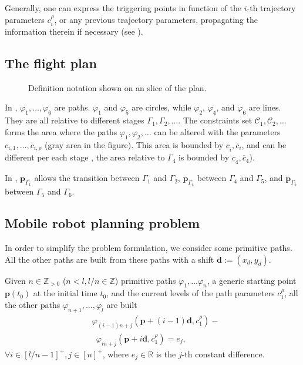 Generally, one can express the triggering points in function of the $i$-th trajectory parameters $c_{i}^{\rho}$, or any previous trajectory parameters, propagating the information therein if necessary (see ).

\subsection{\color{cyan}The flight plan}

\begin{figure}[h]
  \centering
  
  \caption[Definition notation on a slice of the plan]{Definition notation shown on an slice of the plan.}
  \label{fig:traj1}
\end{figure}

In , $\varphi_1,\dots,\varphi_6$ are paths. $\varphi_1$ and $\varphi_5$ are circles, while $\varphi_2$, $\varphi_4$, and $\varphi_6$ are lines. They are all relative to different stages $\Gamma_1,\Gamma_2,\dots$. The constraints set $\mathcal{C}_1,\mathcal{C}_2,\dots$ forms the area where the paths $\varphi_1,\varphi_2,\dots$ can be altered with the parameters $c_{i,1},\dots,c_{i,\rho}$ (gray area in the figure). This area is bounded by $\underline{c}_i,\overline{c}_i$, and can be different per each stage , the area relative to $\Gamma_4$ is bounded by $\underline{c}_4,\overline{c}_4$).

In , $\mathbf{p}_{\Gamma_1}$ allows the transition between $\Gamma_1$ and $\Gamma_2$, $\mathbf{p}_{\Gamma_4}$ between $\Gamma_4$ and $\Gamma_5$, and $\mathbf{p}_{\Gamma_5}$ between $\Gamma_5$ and $\Gamma_6$.

\subsection{Mobile robot planning problem}
\label{sec:plan-pb}

In order to simplify the problem formulation, we consider some primitive paths. All the other paths are built from these paths with a shift $\mathbf{d}:=(x_d,y_d)$.

Given $n\in\mathbb{Z}_{>0}$ ($n<l,l/n\in\mathbb{Z}$) primitive paths $\varphi_1,\dots\varphi_n$, a generic starting point $\mathbf{p}(t_0)$ at the initial time $t_0$, and the current levels of the path parameters $c_1^\rho$, all the other paths $\varphi_{n+1},\dots,\varphi_l$ are built
\begin{equation}\label{eq:primitive}\begin{split}
  &\varphi_{(i-1)n+j}(\mathbf{p}+(i-1)\mathbf{d},c_1^\rho)-\\ &\,\,\,\varphi_{in+j}(\mathbf{p}+i\mathbf{d},c_1^\rho)=e_j,
\end{split}\end{equation}
$\forall i\in[l/n-1]^+,j\in[n]^+$, where $e_j\in\mathbb{R}$ is the $j$-th constant difference.

